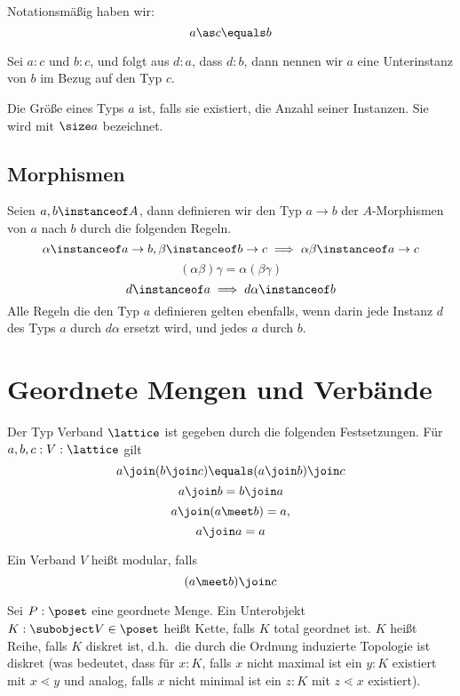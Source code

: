 Notationsmäßig haben wir:
$$
a\as c\equals b
$$


\begin{definition}[Subinstanzen]
    Sei $a:c$ und $b:c$, und folgt aus $d:a$, dass $d:b$, dann nennen wir $a$ eine Unterinstanz
    von $b$ im Bezug auf den Typ $c$.
\end{definition}

\begin{definition}
    Die Größe eines Typs $a$ ist, falls sie existiert, die Anzahl seiner Instanzen. Sie wird mit
    $\size a$ bezeichnet.
\end{definition}

\subsection{Morphismen}

\begin{definition}[Morphismen]
    Seien $a,b\instanceof A$, dann definieren wir den Typ $a\to b$ der $A$-Morphismen von
    $a$ nach $b$ durch die folgenden Regeln.
    $$
    \alpha\instanceof a\to b, \beta\instanceof b\to c\implies \alpha\beta\instanceof a\to c
    $$
    $$
    (\alpha\beta)\gamma=\alpha(\beta\gamma)
    $$
    $$
    d\instanceof a\implies d\alpha\instanceof b
    $$
    Alle Regeln die den Typ $a$ definieren gelten ebenfalls, wenn darin jede Instanz $d$ des
    Typs $a$ durch $d\alpha$ ersetzt wird, und jedes $a$ durch $b$.
\end{definition}

\section{Geordnete Mengen und Verbände}

\begin{definition}
    Der Typ Verband $\lattice$ ist gegeben durch die folgenden Festsetzungen.
    Für $a,b,c:V:\lattice$ gilt
    $$
    a\join(b\join c)\equals (a\join b)\join c
    $$
    $$
    a\join b=b\join a
    $$
    $$
    a\join(a\meet b)=a, 
    $$
    $$
    a\join a=a
    $$
\end{definition}

\begin{definition}
    Ein Verband $V$ heißt modular, falls
    $$
    (a\meet b)\join c
    $$
\end{definition}

\begin{definition}
    Sei $P:\poset$ eine geordnete Menge. Ein Unterobjekt $K:\subobject V\in\poset$ heißt Kette, falls $K$ total geordnet
    ist. $K$ heißt Reihe, falls $K$ diskret ist, d.h.~die durch die Ordnung induzierte Topologie
    ist diskret (was bedeutet, dass für $x:K$, falls $x$ nicht maximal ist ein $y:K$ existiert
    mit $x\lessdot y$ und analog, falls $x$ nicht minimal ist ein $z:K$ mit $z\lessdot x$ existiert). 
\end{definition}

